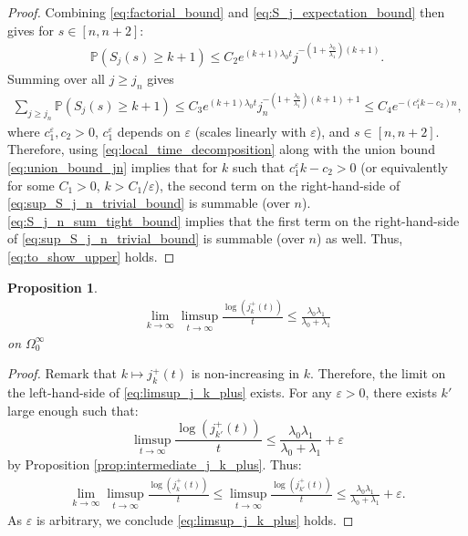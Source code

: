 \documentclass{article}
\numberwithin{equation}{section}
\newtheorem{proposition}{Proposition}
\begin{document}
\begin{proof}
    Combining \ref{eq:factorial_bound} and \ref{eq:S_j_expectation_bound} then gives for $s\in [n,n+2]$:
    \begin{align}
      \mathbb{P}(S_{j}(s)\geq k+1)\leq C_2 e^{(k+1)\lambda_0t}j^{-(1+\frac{\lambda_0}{\lambda_1})(k+1)}.\label{eq:S_j_n_tight_bound}
    \end{align}
    Summing over all $j\geq j_n$ gives
    \begin{align}
        \sum_{j\geq j_n}\mathbb{P}(S_j(s)\geq k+1)\leq C_3e^{(k+1)\lambda_0 t}j_n^{-(1+\frac{\lambda_0}{\lambda_1})(k+1)+1}\leq C_4e^{-(c_1^\varepsilon k-c_2)n},\label{eq:S_j_n_sum_tight_bound}
    \end{align}
    where $c_1^\varepsilon,c_2>0$, $c_1^\varepsilon$ depends on $\varepsilon$ (scales linearly with $\varepsilon$), and $s\in [n,n+2]$. Therefore, using \ref{eq:local_time_decomposition} along with the union bound \ref{eq:union_bound_jn} implies that for $k$ such that $c_1^\varepsilon k-c_2>0$ (or equivalently for some $C_1>0$, $k>C_1/\varepsilon$), the second term on the right-hand-side of \ref{eq:sup_S_j_n_trivial_bound} is summable (over $n$). \ref{eq:S_j_n_sum_tight_bound} implies that the first term on the right-hand-side of \ref{eq:sup_S_j_n_trivial_bound} is summable (over $n$) as well. Thus, \ref{eq:to_show_upper} holds.
\end{proof}

\begin{proposition}\label{prop:limsup_j_k_plus}
  \begin{align}
      \lim_{k\to\infty}\limsup_{t\to\infty}\frac{\log(j_k^+(t))}{t}\leq \frac{\lambda_0\lambda_1}{\lambda_0+\lambda_1}\label{eq:limsup_j_k_plus}
  \end{align}
  on $\Omega_0^\infty$
\end{proposition}
\begin{proof}
    Remark that $k\mapsto j_k^+(t)$ is non-increasing in $k$. Therefore, the limit on the left-hand-side of \ref{eq:limsup_j_k_plus} exists. For any $\varepsilon>0$, there exists $k'$ large enough such that:
    \[\limsup_{t\to\infty}\frac{\log(j_{k'}^+(t))}{t}\leq \frac{\lambda_0\lambda_1}{\lambda_0+\lambda_1}+\varepsilon\]
    by Proposition \ref{prop:intermediate_j_k_plus}. Thus:
    \begin{align*}
        \lim_{k\to\infty}\limsup_{t\to\infty}\frac{\log(j_k^+(t))}{t}\leq \limsup_{t\to\infty}\frac{\log(j_{k'}^+(t))}{t}\leq \frac{\lambda_0\lambda_1}{\lambda_0+\lambda_1}+\varepsilon.
    \end{align*}
    As $\varepsilon$ is arbitrary, we conclude \ref{eq:limsup_j_k_plus} holds.
\end{proof}
\end{document}
